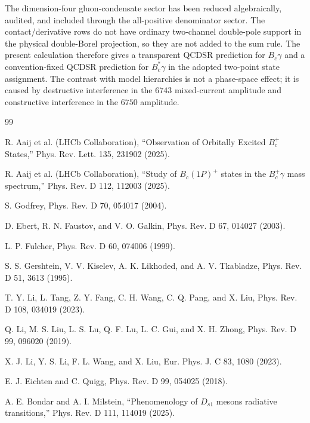 \documentclass[aps,prd,preprint,nofootinbib,superscriptaddress]{revtex4-2}
\newcommand{\Bc}{B_c}
\newcommand{\Bcst}{B_c^\ast}
\begin{document}
The dimension-four gluon-condensate sector has been reduced algebraically,
audited, and included through the all-positive denominator sector.  The
contact/derivative rows do not have ordinary two-channel double-pole support
in the physical double-Borel projection, so they are not added to the sum rule.
The present calculation therefore gives a transparent QCDSR prediction for
\(\Bc\gamma\) and a convention-fixed QCDSR prediction for \(\Bcst\gamma\) in
the adopted two-point state assignment.  The contrast with model hierarchies is
not a phase-space effect; it is caused by destructive interference in the
\(6743\) mixed-current amplitude and constructive interference in the \(6750\)
amplitude.

\begin{thebibliography}{99}

R. Aaij et al. (LHCb Collaboration),
``Observation of Orbitally Excited \(B_c^+\) States,''
Phys. Rev. Lett. 135, 231902 (2025).

R. Aaij et al. (LHCb Collaboration),
``Study of \(B_c(1P)^+\) states in the \(B_c^+\gamma\) mass spectrum,''
Phys. Rev. D 112, 112003 (2025).

S. Godfrey,
Phys. Rev. D 70, 054017 (2004).

D. Ebert, R. N. Faustov, and V. O. Galkin,
Phys. Rev. D 67, 014027 (2003).

L. P. Fulcher,
Phys. Rev. D 60, 074006 (1999).

S. S. Gershtein, V. V. Kiselev, A. K. Likhoded, and A. V. Tkabladze,
Phys. Rev. D 51, 3613 (1995).

T. Y. Li, L. Tang, Z. Y. Fang, C. H. Wang, C. Q. Pang, and X. Liu,
Phys. Rev. D 108, 034019 (2023).

Q. Li, M. S. Liu, L. S. Lu, Q. F. Lu, L. C. Gui, and X. H. Zhong,
Phys. Rev. D 99, 096020 (2019).

X. J. Li, Y. S. Li, F. L. Wang, and X. Liu,
Eur. Phys. J. C 83, 1080 (2023).

E. J. Eichten and C. Quigg,
Phys. Rev. D 99, 054025 (2018).

A. E. Bondar and A. I. Milstein,
``Phenomenology of \(D_{s1}\) mesons radiative transitions,''
Phys. Rev. D 111, 114019 (2025).

\end{thebibliography}
\end{document}
